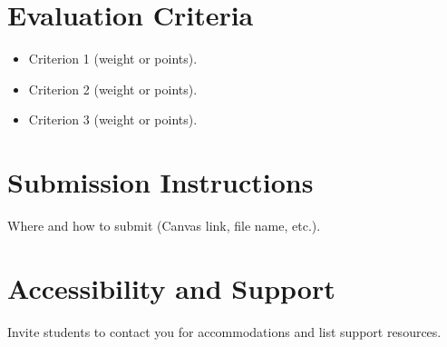 \documentclass[12pt]{article}
\begin{document}
\section*{Evaluation Criteria}
\begin{itemize}
\item Criterion 1 (weight or points).
\item Criterion 2 (weight or points).
\item Criterion 3 (weight or points).
\end{itemize}

\section*{Submission Instructions}
Where and how to submit (Canvas link, file name, etc.).

\section*{Accessibility and Support}
Invite students to contact you for accommodations and list support resources.
\end{document}
